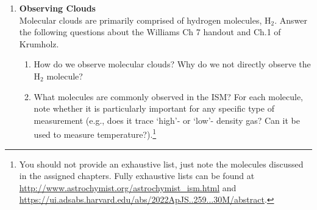 \documentclass{article}
\begin{document}
\begin{enumerate}
\item  \textbf{Observing Clouds} \\
    Molecular clouds are primarily comprised of hydrogen molecules, H$_2$.
    Answer the following questions about the Williams Ch 7 handout
    and Ch.1 of Krumholz.

    \begin{enumerate}
        \item How do we observe molecular clouds?
            Why do we not directly observe the H$_2$ molecule?
        \item What molecules are commonly observed in the ISM?
            For each molecule, note whether it is particularly important for any specific type
            of measurement (e.g., does it trace `high'- or `low'- density gas?  Can it be
            used to measure temperature?).\footnote{
            You should not provide an exhaustive list, just note the molecules discussed in the
            assigned chapters.  Fully exhaustive lists can be found at
            \url{http://www.astrochymist.org/astrochymist_ism.html} and
            \url{https://ui.adsabs.harvard.edu/abs/2022ApJS..259...30M/abstract}.}
    \end{enumerate}


\end{enumerate}




\end{document}
